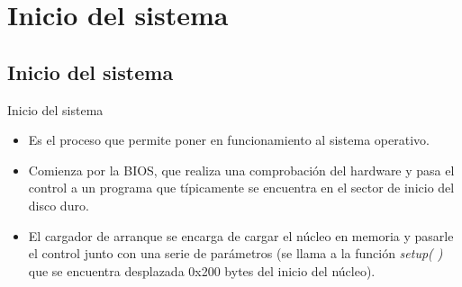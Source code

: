 \section{Inicio del sistema}
\subsection{Inicio del sistema}
\begin{frame}{Inicio del sistema}
	\begin{itemize}
		\item Es el proceso que permite poner en funcionamiento al sistema operativo.
		\item Comienza por la BIOS, que realiza una comprobación del hardware y pasa el control a un programa que típicamente se encuentra en el sector de inicio del disco duro.
		\item El cargador de arranque se encarga de cargar el núcleo en memoria y pasarle el control junto con una serie de parámetros (se llama a la función \emph{setup( )} que se encuentra desplazada 0x200 bytes del inicio del núcleo).
	\end{itemize}
\end{frame}

